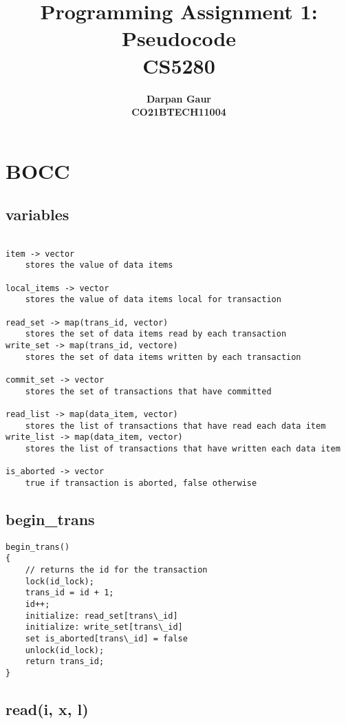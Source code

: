 \documentclass[12pt]{article}
\title{
    \textbf{Programming Assignment 1: Pseudocode} \\ 
    \textbf{CS5280} \\
}
\author{
    \textbf{Darpan Gaur} \\
    \textbf{CO21BTECH11004}
}
\date{}
\begin{document}
\maketitle

\hrulefill

\section*{BOCC}

\subsection*{variables}
\begin{lstlisting}

item -> vector 
    stores the value of data items 

local_items -> vector
    stores the value of data items local for transaction

read_set -> map(trans_id, vector)  
    stores the set of data items read by each transaction
write_set -> map(trans_id, vectore)  
    stores the set of data items written by each transaction

commit_set -> vector
    stores the set of transactions that have committed

read_list -> map(data_item, vector)  
    stores the list of transactions that have read each data item
write_list -> map(data_item, vector)  
    stores the list of transactions that have written each data item

is_aborted -> vector
    true if transaction is aborted, false otherwise

\end{lstlisting}

\subsection*{begin\_trans}

\begin{lstlisting}
begin_trans()
{
    // returns the id for the transaction
    lock(id_lock);
    trans_id = id + 1;
    id++;
    initialize: read_set[trans\_id]
    initialize: write_set[trans\_id]
    set is_aborted[trans\_id] = false 
    unlock(id_lock);
    return trans_id;
}
\end{lstlisting}

\subsection*{read(i, x, l)}
\end{document}
